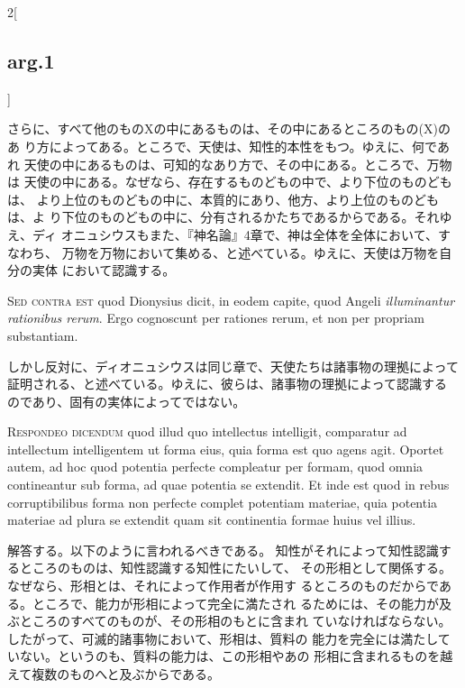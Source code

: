 \documentclass[paper=a4paper,fontsize=10pt,jafontsize=9pt,titlepage]{jlreq}
\begin{document}
\begin{paracol}{2}[\subsection{arg.1}]
\switchcolumn

さらに、すべて他のものXの中にあるものは、その中にあるところのもの(X)のあ
 り方によってある。ところで、天使は、知性的本性をもつ。ゆえに、何であれ
 天使の中にあるものは、可知的なあり方で、その中にある。ところで、万物は
 天使の中にある。なぜなら、存在するものどもの中で、より下位のものどもは、
 より上位のものどもの中に、本質的にあり、他方、より上位のものどもは、よ
 り下位のものどもの中に、分有されるかたちであるからである。それゆえ、ディ
 オニュシウスもまた、『神名論』4章で、神は全体を全体において、すなわち、
 万物を万物において集める、と述べている。ゆえに、天使は万物を自分の実体
 において認識する。

\switchcolumn*[\subsection{s.c.}]

{\scshape  Sed contra est} quod Dionysius dicit, in eodem capite, quod
Angeli {\itshape illuminantur rationibus rerum}. Ergo cognoscunt per rationes
rerum, et non per propriam substantiam.

\switchcolumn

しかし反対に、ディオニュシウスは同じ章で、天使たちは諸事物の理拠によって
 証明される、と述べている。ゆえに、彼らは、諸事物の理拠によって認識する
 のであり、固有の実体によってではない。


{\scshape Respondeo dicendum} quod illud quo intellectus intelligit,
comparatur ad intellectum intelligentem ut forma eius, quia forma est
quo agens agit. Oportet autem, ad hoc quod potentia perfecte compleatur
per formam, quod omnia contineantur sub forma, ad quae potentia se
extendit. Et inde est quod in rebus corruptibilibus forma non perfecte
complet potentiam materiae, quia potentia materiae ad plura se extendit
quam sit continentia formae huius vel illius.

\switchcolumn

解答する。以下のように言われるべきである。
知性がそれによって知性認識するところのものは、知性認識する知性にたいして、
 その形相として関係する。なぜなら、形相とは、それによって作用者が作用す
 るところのものだからである。ところで、能力が形相によって完全に満たされ
 るためには、その能力が及ぶところのすべてのものが、その形相のもとに含まれ
 ていなければならない。したがって、可滅的諸事物において、形相は、質料の
 能力を完全には満たしていない。というのも、質料の能力は、この形相やあの
 形相に含まれるものを越えて複数のものへと及ぶからである。


\end{paracol}
\end{document}
